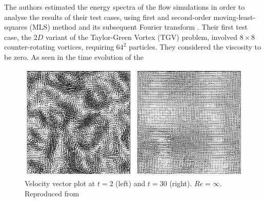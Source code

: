 The authors estimated the energy spectra of the flow simulations in order to analyse the results of their test cases, using first and second-order moving-least-squares (MLS) method \parencite{gossler2001moving} and its subsequent Fourier transform \parencite{frigo2005design}.
Their first test case, the $2D$ variant of the Taylor-Green Vortex (TGV) problem, involved $8\times 8$ counter-rotating vortices, requiring $64^2$ particles. They considered the viscosity to be zero.
As seen in the time evolution of the 
\begin{figure}[htbp!]
    \centering
    \includegraphics[scale=0.7]{Figures/research_papers/adami2012-evolution-vel-field-tgv.png}
    \caption{Velocity vector plot at $t=2$ (left) and $t=30$ (right). $Re = \infty$. Reproduced from \cite{Adami2012} }
    \label{fig:adami2012-evolution-vel-field-tgv}
\end{figure}

